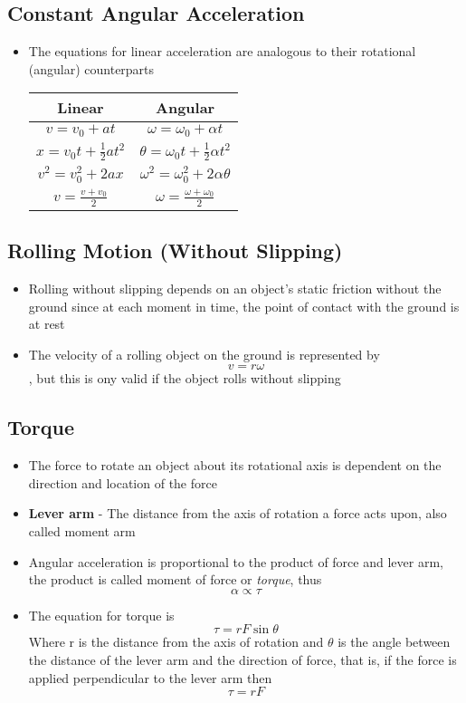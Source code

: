 \subsection{Constant Angular Acceleration}
\begin{itemize}
    \item The equations for linear acceleration are analogous to their rotational (angular) counterparts
    \begin{center}
\begin{tabular}{|c | c|} 
 \hline
 Linear & Angular \\ [1ex]
 \hline
 $v=v_0+at$ & $\omega=\omega_0+\alpha t$ \\ [1ex]
 \hline
 $x=v_0t+\frac{1}{2}at^2$ & $\theta=\omega_0t+\frac{1}{2}\alpha t^2$ \\ [1ex]
 \hline
 $v^2=v_0^2+2ax$ & $\omega^2=\omega_0^2+2\alpha\theta$ \\ [1ex]
 \hline
 $v=\frac{v+v_0}{2}$ & $\omega=\frac{\omega+\omega_0}{2}$ \\ [1ex]
 \hline
\end{tabular}
\end{center}
\end{itemize}

\subsection{Rolling Motion (Without Slipping)}
\begin{itemize}
    \item Rolling without slipping depends on an object's static friction without the ground since at each moment in time, the point of contact with the ground is at rest
    \item The velocity of a rolling object on the ground is represented by \[v=r\omega\], but this is ony valid if the object rolls without slipping
\end{itemize}

\subsection{Torque}
\begin{itemize}
    \item The force to rotate an object about its rotational axis is dependent on the direction and location of the force
    \item \textbf{Lever arm} - The distance from the axis of rotation a force acts upon, also called moment arm
    \item Angular acceleration is proportional to the product of force and lever arm, the product is called moment of force or \emph{torque}, thus \[\alpha\propto\tau\]
    \item The equation for torque is \[\tau=rF\sin\theta\] Where r is the distance from the axis of rotation and \(\theta\) is the angle between the distance of the lever arm and the direction of force, that is, if the force is applied perpendicular to the lever arm then \[\tau=rF\]
\end{itemize}

